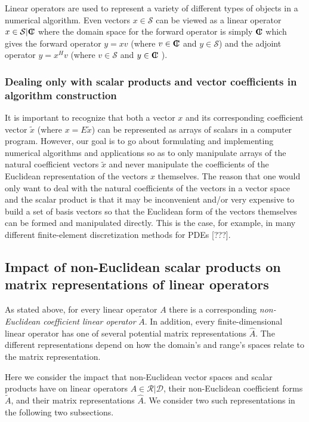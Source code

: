 Linear operators are used to represent a variety of different types of objects
in a numerical algorithm.  Even vectors $x\in\mathcal{S}$ can be viewed as a
linear operator $x\in\mathcal{S}|\mbox{\textbf{C}}\hspace{-1.1ex}\mbox{l}\hspace{0.4ex}$ where the domain space for the forward
operator is simply $\mbox{\textbf{C}}\hspace{-1.1ex}\mbox{l}\hspace{0.4ex}$ which gives the forward operator $y = x v$ (where
$v\in\mbox{\textbf{C}}\hspace{-1.1ex}\mbox{l}\hspace{0.4ex}$ and $y\in\mathcal{S}$) and the adjoint operator $y = x^H v$ (where
$v\in\mathcal{S}$ and $y\in\mbox{\textbf{C}}\hspace{-1.1ex}\mbox{l}\hspace{0.4ex}$ ).

\subsubsection{Dealing only with scalar products and vector coefficients in algorithm construction}

It is important to recognize that both a vector $x$ and its corresponding
coefficient vector $\tilde{x}$ (where $x = E\tilde{x}$) can be represented as
arrays of scalars in a computer program.  However, our goal is to go about
formulating and implementing numerical algorithms and applications so as to
only manipulate arrays of the natural coefficient vectors $\tilde{x}$ and
never manipulate the coefficients of the Euclidean representation of the
vectors $x$ themselves.  The reason that one would only want to deal with the
natural coefficients of the vectors in a vector space and the scalar product
is that it may be inconvenient and/or very expensive to build a set of basis
vectors so that the Euclidean form of the vectors themselves can be formed and
manipulated directly.  This is the case, for example, in many different
finite-element discretization methods for PDEs [???].

\subsection{Impact of non-Euclidean scalar products on matrix representations of linear operators}
\label{sec:matrix_representations_of_linear_operators}

As stated above, for every linear operator $A$ there is a corresponding
{}\textit{non-Euclidean coefficient linear operator} $\tilde{A}$.  In
addition, every finite-dimensional linear operator has one of several
potential matrix representations $\hat{A}$.  The different representations
depend on how the domain's and range's spaces relate to the matrix
representation.

Here we consider the impact that non-Euclidean vector spaces and scalar
products have on linear operators $A\in\mathcal{R}|\mathcal{D}$, their
non-Euclidean coefficient forms $\tilde{A}$, and their matrix
representations $\hat{A}$.  We consider two such representations in the
following two subsections.

